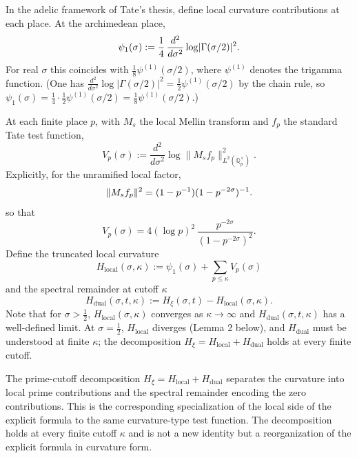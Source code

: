 \documentclass[11pt]{article}
\begin{document}
In the adelic framework of Tate's thesis, define local curvature contributions at each place. At the archimedean place,
\begin{equation}
\psi_1(\sigma) := \frac{1}{4}\,\frac{d^2}{d\sigma^2}\log\lvert\Gamma(\sigma/2)\rvert^2.\notag
\end{equation}
For real $\sigma$ this coincides with $\frac18\psi^{(1)}(\sigma/2)$, where $\psi^{(1)}$ denotes the trigamma function. (One has $\frac{d^2}{d\sigma^2}\log\lvert\Gamma(\sigma/2)\rvert^2 = \frac12\psi^{(1)}(\sigma/2)$ by the chain rule, so $\psi_1(\sigma)=\frac14\cdot\frac12\psi^{(1)}(\sigma/2)=\frac18\psi^{(1)}(\sigma/2)$.)

At each finite place $p$, with $M_s$ the local Mellin transform and $f_p$ the standard Tate test function,
\begin{equation}
V_p(\sigma) := \frac{d^2}{d\sigma^2}\log\|M_s f_p\|^2_{L^2(\mathbb{Q}_p^\times)}.
\tag{2}
\end{equation}
Explicitly, for the unramified local factor,
\begin{equation}
\|M_s f_p\|^2 = (1-p^{-1})(1-p^{-2\sigma})^{-1}.\notag
\end{equation}
so that
\begin{equation}\label{eq:Vp}
V_p(\sigma)=4(\log p)^2\,\frac{p^{-2\sigma}}{(1-p^{-2\sigma})^2}.
\tag{3}
\end{equation}
Define the truncated local curvature
\begin{equation}
H_{\mathrm{local}}(\sigma,\kappa) := \psi_1(\sigma)+\sum_{p\le \kappa} V_p(\sigma)
\tag{4}
\end{equation}
and the spectral remainder at cutoff $\kappa$
\begin{equation}
H_{\mathrm{dual}}(\sigma,t,\kappa) := H_{\xi}(\sigma,t)-H_{\mathrm{local}}(\sigma,\kappa).
\tag{5}
\end{equation}
Note that for $\sigma>\tfrac12$, $H_{\mathrm{local}}(\sigma,\kappa)$ converges as $\kappa\to\infty$ and $H_{\mathrm{dual}}(\sigma,t,\kappa)$ has a well-defined limit. At $\sigma=\tfrac12$, $H_{\mathrm{local}}$ diverges (Lemma 2 below), and $H_{\mathrm{dual}}$ must be understood at finite $\kappa$; the decomposition $H_{\xi}=H_{\mathrm{local}}+H_{\mathrm{dual}}$ holds at every finite cutoff.

The prime-cutoff decomposition $H_{\xi}=H_{\mathrm{local}}+H_{\mathrm{dual}}$ separates the curvature into local prime contributions and the spectral remainder encoding the zero contributions. This is the corresponding specialization of the local side of the explicit formula to the same curvature-type test function. The decomposition holds at every finite cutoff $\kappa$ and is not a new identity but a reorganization of the explicit formula in curvature form.
\end{document}
